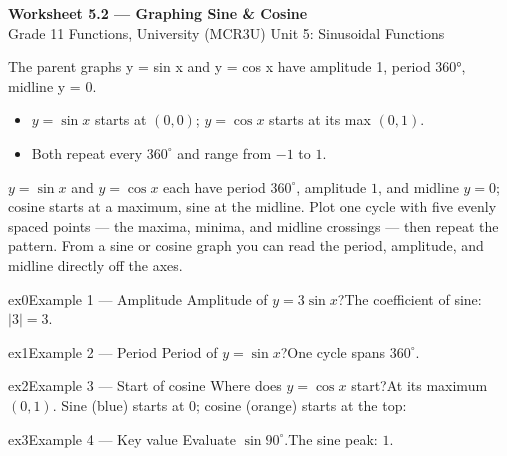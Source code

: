 \documentclass[11pt]{article}
\begin{document}
\begin{center}
{\LARGE\bfseries\color{titleblue}Worksheet 5.2 --- Graphing Sine \& Cosine}\\[2pt]
{\small Grade 11 Functions, University (MCR3U) \textperiodcentered{} Unit 5: Sinusoidal Functions}
\end{center}

\begin{ideabox}
The parent graphs y = sin x and y = cos x have amplitude 1, period 360°, midline y = 0.
\begin{itemize}[leftmargin=*,itemsep=2pt]
  \item $y=\sin x$ starts at $(0,0)$; $y=\cos x$ starts at its max $(0,1)$.
  \item Both repeat every $360^\circ$ and range from $-1$ to $1$.
\end{itemize}
\end{ideabox}

\begin{learnbox}
$y=\sin x$ and $y=\cos x$ each have period $360^\circ$, amplitude $1$, and midline $y=0$; cosine starts at a maximum, sine at the midline.
Plot one cycle with five evenly spaced points — the maxima, minima, and midline crossings — then repeat the pattern.
From a sine or cosine graph you can read the period, amplitude, and midline directly off the axes.
\end{learnbox}


\begin{example}{ex0}{Example 1 --- Amplitude}
Amplitude of $y=3\sin x$?\soln The coefficient of sine: $|3|=3$.
\end{example}

\begin{example}{ex1}{Example 2 --- Period}
Period of $y=\sin x$?\soln One cycle spans $360^\circ$.
\end{example}

\begin{example}{ex2}{Example 3 --- Start of cosine}
Where does $y=\cos x$ start?\soln At its maximum $(0,1)$. Sine (blue) starts at $0$; cosine (orange) starts at the top:
\end{example}

\begin{example}{ex3}{Example 4 --- Key value}
Evaluate $\sin90^\circ$.\soln The sine peak: $1$.
\end{example}
\end{document}
